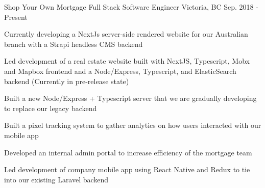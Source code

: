\begin{cventries}
\cventry
{Shop Your Own Mortgage} %
{Full Stack Software Engineer} %
{Victoria, BC} %
{Sep. 2018 - Present} %
{ %
\begin{cvitems}
\item {Currently developing a NextJs server-side rendered website for our Australian branch with a Strapi headless CMS backend}
\item {Led development of a real estate website built with NextJS, Typescript, Mobx and Mapbox frontend and a Node/Express, Typescript, and ElasticSearch backend (Currently in pre-release state)}
\item {Built a new Node/Express + Typescript server that we are gradually developing to replace our legacy backend}
\item {Built a pixel tracking system to gather analytics on how users interacted with our mobile app}
\item {Developed an internal admin portal to increase efficiency of the mortgage team}
\item {Led development of company mobile app using React Native and Redux to tie into our existing Laravel backend}
\end{cvitems}
}

\end{cventries}
